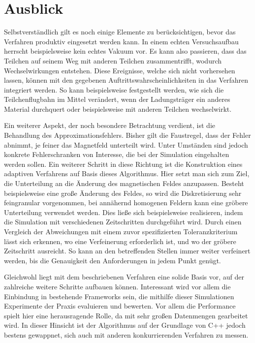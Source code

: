 \chapter{Ausblick}

Selbstverst\"andlich gilt es noch einige Elemente zu ber\"ucksichtigen, bevor das Verfahren produktiv eingesetzt werden kann.
In einem echten Versuchsaufbau herrscht beispielsweise kein echtes Vakuum vor. Es kann also passieren, dass das Teilchen auf seinem
Weg mit anderen Teilchen zusammentrifft, wodurch Wechselwirkungen entstehen. Diese Ereignisse, welche
sich nicht vorhersehen lassen, k\"onnen mit den gegebenen Auftrittswahrscheinlichkeiten in das Verfahren integriert werden. So kann beispielsweise festgestellt werden, wie sich die Teilchenflugbahn im Mittel ver\"andert,
wenn der Ladungstr\"ager ein anderes Material durchquert oder beispielsweise mit anderen Teilchen wechselwirkt.

Ein weiterer Aspekt, der noch besondere Betrachtung verdient, ist die Behandlung des Approximationsfehlers. Bisher gilt die Faustregel, dass
der Fehler abnimmt, je feiner das Magnetfeld unterteilt wird. Unter Umst\"anden sind jedoch konkrete Fehlerschranken von Interesse, die bei der
Simulation eingehalten werden sollen. Ein weiterer Schritt in diese Richtung ist die Konstruktion eines adaptiven Verfahrens auf Basis dieses Algorithmus.
Hier setzt man sich zum Ziel, die Unterteilung an die \"Anderung des magnetischen Feldes anzupassen. Besteht beispielsweise eine
gro{\ss}e \"Anderung des Feldes, so wird die Diskretisierung sehr feingranular vorgenommen, bei ann\"ahernd homogenen Feldern kann
eine gr\"obere Unterteilung verwendet werden. Dies lie{\ss}e sich beispielsweise realisieren, indem die Simulation mit
verschiedenen Zeitschritten durchgef\"uhrt wird. Durch einen Vergleich der Abweichungen mit einem zuvor spezifizierten
Toleranzkriterium l\"asst sich erkennen, wo eine Verfeinerung erforderlich ist, und wo der gr\"obere Zeitschritt ausreicht.
So kann an den betreffenden Stellen immer weiter verfeinert werden, bis die Genauigkeit den Anforderungen in jedem Punkt gen\"ugt.

Gleichwohl liegt mit dem beschriebenen Verfahren eine solide Basis vor, auf der zahlreiche weitere Schritte aufbauen k\"onnen. Interessant
wird vor allem die Einbindung in bestehende Frameworks sein, die mithilfe dieser Simulationen Experimente der Praxis evaluieren und bewerten.
Vor allem die Performance spielt hier eine herausragende Rolle, da mit sehr gro{\ss}en Datenmengen gearbeitet wird. In dieser Hinsicht ist der
Algorithmus auf der Grundlage von C++ jedoch bestens gewappnet, sich auch  mit anderen konkurrierenden Verfahren zu messen.
